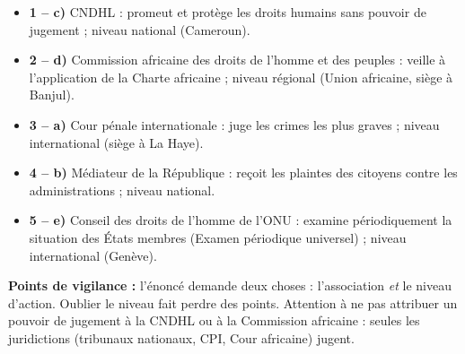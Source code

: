 \documentclass[11pt]{article}
\newcommand{\cle}[1]{{\popxbold\color{popdark}#1}}
\begin{document}
\begin{corrige}
\begin{itemize}
\item \textbf{1 -- c)} CNDHL : promeut et protège les droits humains sans pouvoir de jugement ; niveau \cle{national} (Cameroun).
\item \textbf{2 -- d)} Commission africaine des droits de l'homme et des peuples : veille à l'application de la Charte africaine ; niveau \cle{régional} (Union africaine, siège à Banjul).
\item \textbf{3 -- a)} Cour pénale internationale : juge les crimes les plus graves ; niveau \cle{international} (siège à La Haye).
\item \textbf{4 -- b)} Médiateur de la République : reçoit les plaintes des citoyens contre les administrations ; niveau \cle{national}.
\item \textbf{5 -- e)} Conseil des droits de l'homme de l'ONU : examine périodiquement la situation des États membres (Examen périodique universel) ; niveau \cle{international} (Genève).
\end{itemize}

\textbf{Points de vigilance :} l'énoncé demande deux choses : l'association \emph{et} le niveau d'action. Oublier le niveau fait perdre des points. Attention à ne pas attribuer un pouvoir de jugement à la CNDHL ou à la Commission africaine : seules les juridictions (tribunaux nationaux, CPI, Cour africaine) jugent.
\end{corrige}
\end{document}
